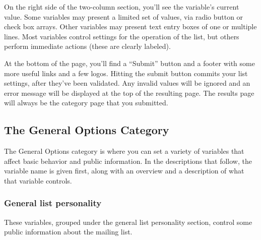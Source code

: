 \documentclass{howto}
\begin{document}
On the right side of the two-column section, you'll see the variable's
current value.  Some variables may present a limited set of values,
via radio button or check box arrays.  Other variables may present
text entry boxes of one or multiple lines.  Most variables control
settings for the operation of the list, but others perform immediate
actions (these are clearly labeled).

At the bottom of the page, you'll find a ``Submit'' button and a
footer with some more useful links and a few logos.  Hitting the
submit button commits your list settings, after they've been
validated.  Any invalid values will be ignored and an error message
will be displayed at the top of the resulting page.  The results page
will always be the category page that you submitted.

\subsection{The General Options Category}

The General Options category is where you can set a variety of
variables that affect basic behavior and public information.  In the
descriptions that follow, the variable name is given first, along with
an overview and a description of what that variable controls.

\subsubsection{General list personality}

These variables, grouped under the general list personality section,
control some public information about the mailing list.
\end{document}
